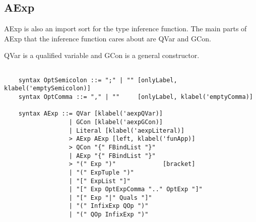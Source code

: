 \subsection{AExp}
AExp is also an import sort for the type inference function. The main parts of AExp that the inference function cares about are QVar and GCon.

QVar is a qualified variable and GCon is a general constructor.

\begin{lstlisting}

    syntax OptSemicolon ::= ";" | "" [onlyLabel, klabel('emptySemicolon)]
    syntax OptComma ::= "," | ""     [onlyLabel, klabel('emptyComma)]

    syntax AExp ::= QVar [klabel('aexpQVar)]
                  | GCon [klabel('aexpGCon)]
                  | Literal [klabel('aexpLiteral)]
                  > AExp AExp [left, klabel('funApp)]
                  > QCon "{" FBindList "}"
                  | AExp "{" FBindList "}"
                  > "(" Exp ")"             [bracket]
                  | "(" ExpTuple ")"
                  | "[" ExpList "]"
                  | "[" Exp OptExpComma ".." OptExp "]"
                  | "[" Exp "|" Quals "]"
                  | "(" InfixExp QOp ")"
                  | "(" QOp InfixExp ")"
                           
\end{lstlisting}
